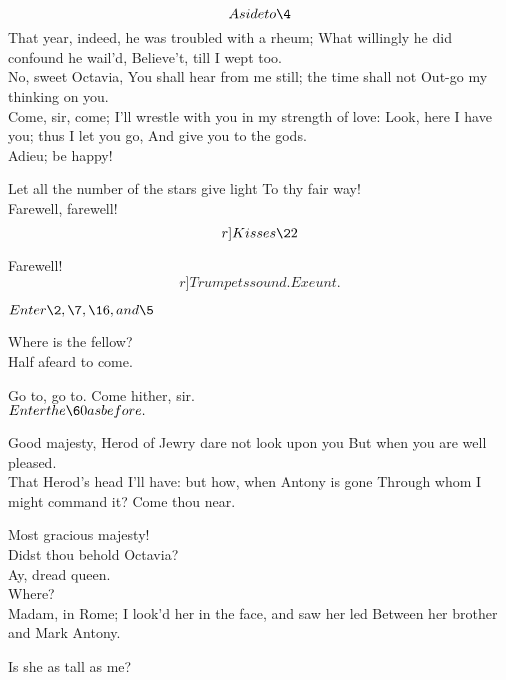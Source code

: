 \documentclass{book}
\begin{document}
	\[Aside to \4\]  That year, indeed, he was troubled with a rheum;
	What willingly he did confound he wail'd,
	Believe't, till I wept too. \\

\3	No, sweet Octavia,
	You shall hear from me still; the time shall not
	Out-go my thinking on you. \\

\1	Come, sir, come;
	I'll wrestle with you in my strength of love:
	Look, here I have you; thus I let you go,
	And give you to the gods. \\

\3	Adieu; be happy!

	Let all the number of the stars give light
	To thy fair way! \\

\3	Farewell, farewell! \\  \[r]Kisses \22\]

\1	Farewell!
	\[r]Trumpets sound. Exeunt.\]







	\(Enter \2, \7, \16, and \5\)

\2	Where is the fellow? \\

\5	Half afeard to come.

\2	Go to, go to. 	Come hither, sir. \\

	\(Enter the \60 as before.\)


\5	Good majesty,
	Herod of Jewry dare not look upon you
	But when you are well pleased. \\

\2	That Herod's head
	I'll have: but how, when Antony is gone
	Through whom I might command it? Come thou near.

	Most gracious majesty!  \\

\2	Didst thou behold
        Octavia? \\

	Ay, dread queen. \\

\2	Where? \\

	Madam, in Rome;
	I look'd her in the face, and saw her led
	Between her brother and Mark Antony.

\2	Is she as tall as me? \\
\end{document}
